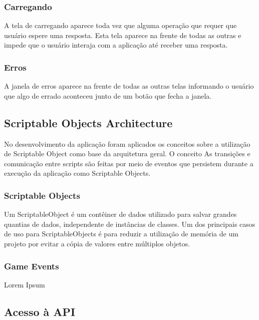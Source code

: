 \subsubsection{Carregando}
\label{subsubsec:carregando}

A tela de carregando aparece toda vez que alguma operação que requer que usuário espere uma resposta. Esta tela aparece na frente de todas as outras e impede que o usuário interaja com a aplicação até receber uma resposta.


\subsubsection{Erros}
\label{subsubsec:erros}

A janela de erros aparece na frente de todas as outras telas informando o usuário que algo de errado aconteceu junto de um botão que fecha a janela.

\subsection{Scriptable Objects Architecture}
\label{subsec:scriptableobjectsarch}

No desenvolvimento da aplicação foram aplicados os conceitos sobre a utilização de Scriptable Object como base da arquitetura geral. O conceito
As transições e comunicação entre scripts são feitas por meio de eventos que persistem durante a execução da aplicação como Scriptable Objects.

\subsubsection{Scriptable Objects}
\label{subsubsec:scriptableobjects}

Um ScriptableObject é um contêiner de dados utilizado para salvar grandes quantias de dados, independente de instâncias de classes. Um dos principais casos de uso para ScriptableObjects é para reduzir a utilização de memória de um projeto por evitar a cópia de valores entre múltiplos objetos.\cite{scriptableobject}


\subsubsection{Game Events}
\label{subsubsec:gameevents}

Lorem Ipsum


\subsection{Acesso à API}
\label{subsec:acessoapi}

